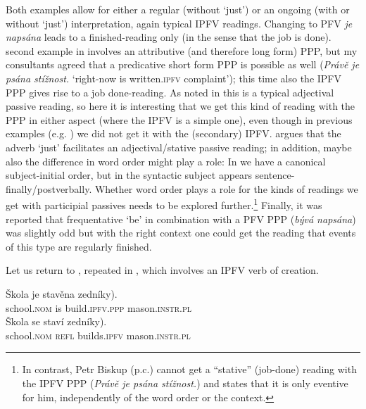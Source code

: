 \documentclass[output=paper,colorlinks,citecolor=brown]{langscibook}
\begin{document}
\noindent Both examples allow for either a regular (without `just') or an ongoing (with or without `just') interpretation, again typical IPFV readings. Changing  to PFV \textit{je napsána} leads to a finished-reading only (in the sense that the job is done).  second example in  involves an attributive (and therefore long form) PPP, but my consultants agreed that a predicative short form PPP is possible as well (\textit{Právě je psána stížnost.} `right-now is written.\textsc{ipfv} complaint'); this time also the IPFV PPP gives rise to a job done-reading. As noted in  this is a typical adjectival passive reading, so here it is interesting that we get this kind of reading with the PPP in either aspect (where the IPFV is a simple one), even though in previous examples (e.g. ) we did not get it with the (secondary) IPFV. \citet{karlik20} argues that the adverb `just' facilitates an adjectival/stative passive reading; in addition, maybe also the difference in word order might play a role: In  we have a canonical subject-initial order, but in  the syntactic subject appears sentence-finally/postverbally. Whether word order plays a role for the kinds of readings we get with participial passives needs to be explored further.\footnote{In contrast, Petr Biskup (p.c.) cannot get a ``stative'' (job-done) reading with the IPFV PPP (\textit{Právě je psána stížnost.}) and states that it is only eventive for him, independently of the word order or the context.} Finally, it was reported that frequentative `be' in combination with a PFV PPP (\textit{bývá napsána}) was slightly odd but with the right context one could get the reading that events of this type are regularly finished.

Let us return to , repeated in , which involves an IPFV verb of creation.

\ea\label{ex:karlikbyrep}
\ea
\gll Škola je stavěna \minsp{(} zedníky).\\
	school.\textsc{nom} is build.\textsc{ipfv.ppp} {} mason.\textsc{instr.pl}\\
\ex
\gll Škola se staví \minsp{(*} zedníky).\\
	school.\textsc{nom} \textsc{refl} builds.\textsc{ipfv} {} mason.\textsc{instr.pl}\\
\z 
\z 
\end{document}
